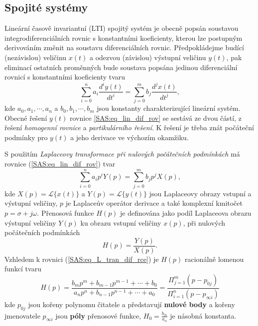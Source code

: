     \subsection{Spojité systémy}
      Lineární časově invariantní (LTI) spojitý systém je obecně popsán soustavou
      integrodiferenciálních rovnic s konstantními koeficienty, kterou lze postupným derivováním
      změnit na soustavu diferenciálních rovnic. Předpokládej\-me budící (ne\-zá\-vis\-lou) veličinu
      $x(t)$ a odezvou (závislou) výstupní veličinu $y(t)$, pak eliminací ostatních proměnných bude soustava 
      popsána jedinou diferenciální rovnicí s konstantními koeficienty tvaru
      \begin{equation}\label{SAS:eq_lin_dif_rov}
          \sum_{i=0}^na_i\frac{d^iy(t)}{dt^i}=\sum_{j=0}^mb_j\frac{d^jx(t)}{dt^j},
      \end{equation}
      kde $a_0, a_1, \cdots ,a_n$ a $b_0, b_1, \cdots ,b_m$ jsou konstanty charakterizující lineární
      systém. Obecné řešení $y(t)$ rovnice \ref{SAS:eq_lin_dif_rov} se sestává ze dvou částí, z řešení 
      \emph{homogenní rovnice} a \emph{partikulárního řešení}. K řešení je třeba znát počáteční podmínky pro 
      $y(t)$ a jeho derivace ve výchozím okamžiku.
  
      S použitím \emph{Laplaceovy transformace při nulových počátečních podmínkách} má rovnice
      (\ref{SAS:eq_lin_dif_rov}) tvar
      \begin{equation}\label{SAS:eq_L_tran_dif_rce}
        \sum_{i=0}^na_ip^iY(p)=\sum_{j=0}^mb_jp^jX(p),
      \end{equation}
      kde $X(p)=\mathcal{L}\{x(t)\}$ a $Y(p)=\mathcal{L}\{y(t)\}$ jsou Laplaceovy obrazy vstupní a
      výstupní veličiny, $p$ je Laplaceův operátor derivace a také komplexní kmitočet $p=\sigma+j\omega$. 
      Přenosová funkce $H(p)$ je definována jako podíl Laplaceova obrazu výstupní veličiny $Y(p)$ ku obrazu 
      vstupní veličiny $x(p)$, při nulových počátečních podmínkách
      \begin{equation}\label{SAS:eq_Hp_popis}
          H(p)=\frac{Y(p)}{X(p)}.
      \end{equation}
      Vzhledem k rovnici (\ref{SAS:eq_L_tran_dif_rce}) je $H(p)$ racionálně lomenou funkcí tvaru
      \begin{equation}\label{SAS:eq_Hp_rozvinute}
          H(p)=\frac{b_mp^m+b_{m-1}p^{m-1}+\cdots+b_0}{a_np^n+b_{n-1}p^{n-1}+\cdots+a_0} 
              =\frac{\Pi_{j=1}^m(p-p_{0j})}{\Pi_{i=1}^n(p-p_{\infty i})}
      \end{equation}
      kde $p_{0j}$ jsou kořeny polynomu čitatele a představují \textbf{nulové body} a kořeny
      jmenovatele $p_{\infty i}$ jsou \textbf{póly} přenosové funkce, $H_0=\frac{b_m}{a_n}$ je
      násobná konstanta.
  
